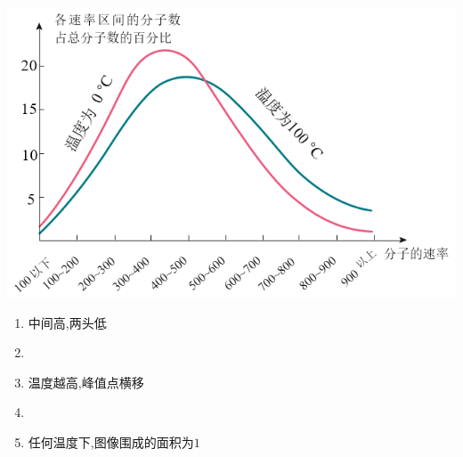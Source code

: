 \documentclass{article}
\begin{document}
\begin{itemize}
          \begin{minipage}{0.45\textwidth}
              \includegraphics[width=\textwidth,keepaspectratio]{./pictures/23.png}
          \end{minipage}
          \hfill
          \begin{minipage}{0.45\textwidth}
              \begin{enumerate}[label = (\arabic*)]
                  \item 中间高,两头低
                  \item[]
                  \item 温度越高,峰值点横移
                  \item[]
                  \item 任何温度下,图像围成的面积为$1$
              \end{enumerate}
          \end{minipage}
\end{itemize}

\vspace{2em}
\end{document}
